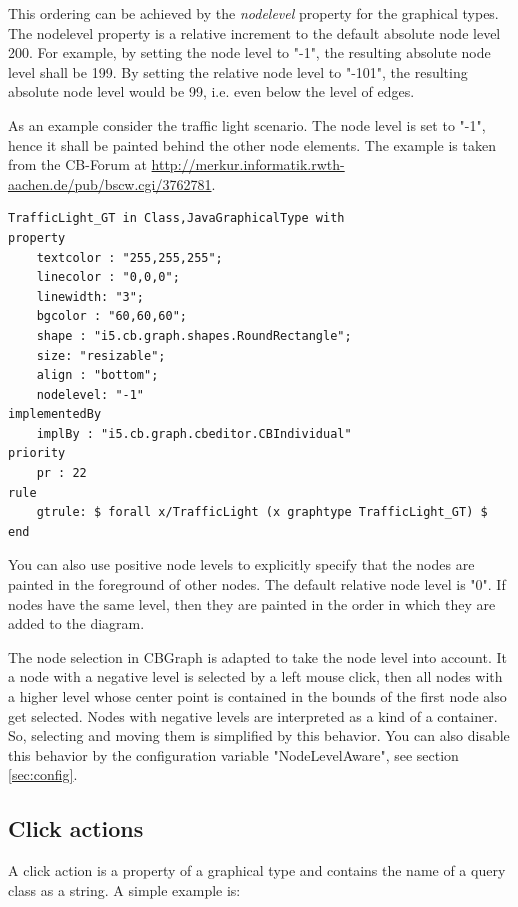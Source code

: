 This ordering can be achieved by the {\em nodelevel\/} property for the graphical types. The nodelevel
property is a relative increment to the default absolute node level 200. For example, by setting
the node level to "-1", the resulting absolute node level shall be 199. By setting the relative
node level to "-101", the resulting absolute node level would be 99, i.e. even below the level of edges. 

As an example consider the traffic light scenario. The node level is set to "-1", hence it shall
be painted behind the other node elements. The example is taken from the CB-Forum at
\url{http://merkur.informatik.rwth-aachen.de/pub/bscw.cgi/3762781}.


{\small
\begin{verbatim}
TrafficLight_GT in Class,JavaGraphicalType with
property
    textcolor : "255,255,255";
    linecolor : "0,0,0";
    linewidth: "3";
    bgcolor : "60,60,60";
    shape : "i5.cb.graph.shapes.RoundRectangle";
    size: "resizable";
    align : "bottom";
    nodelevel: "-1"
implementedBy
    implBy : "i5.cb.graph.cbeditor.CBIndividual"
priority
    pr : 22
rule
    gtrule: $ forall x/TrafficLight (x graphtype TrafficLight_GT) $
end
\end{verbatim}
}

You can also use positive node levels to explicitly specify that the nodes are painted 
in the foreground of other nodes. The default relative node level is "0". 
If nodes have the same level, then they are painted in the order in which they are added
to the diagram.

The node selection in CBGraph is adapted to take the node level into account. It a node
with a negative level is selected by a left mouse click, then all nodes with a higher level
whose center point is contained in the bounds of the first node also get selected. Nodes with
negative levels are interpreted as a kind of a container. So, selecting and moving them
is simplified by this behavior. You can also disable this behavior by the configuration
variable "NodeLevelAware", see section \ref{sec:config}.





\subsection{Click actions}
\label{sec:clickactions}

A click action is a property of a graphical type and contains 
the name of a query class as a string. A simple example is:

